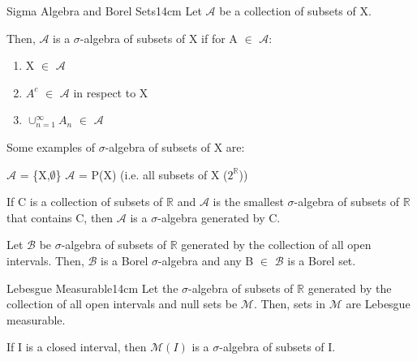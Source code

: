     \begin{definition}{Sigma Algebra and Borel Sets}{14cm}
        Let $\mathcal{A}$ be a collection of subsets of X.

        Then, $\mathcal{A}$ is a {\color{lblue} $\sigma$-algebra}
        of subsets of X if for A $\in$ $\mathcal{A}$:

        \begin{enumerate}[label=(\alph*), itemsep=1.5cm, itemsep=0.1cm]
            \item X $\in$ $\mathcal{A}$
            
            \item $A^c$ $\in$ $\mathcal{A}$ in respect to X
            
            \item $\cup_{n=1}^{\infty} A_n$ $\in$ $\mathcal{A}$
        \end{enumerate}

        Some examples of $\sigma$-algebra of subsets of X are:

        \hspace{0.5cm}
        $\mathcal{A}$ = \{X,$\emptyset$\}
        \hspace{1cm}
        $\mathcal{A}$ = P(X) (i.e. all subsets of X ($2^{\mathbb{R}}$))

        \vspace{0.3cm}

        If C is a collection of subsets of $\mathbb{R}$
        and $\mathcal{A}$ is the smallest $\sigma$-algebra of subsets
        of $\mathbb{R}$ that contains C, then $\mathcal{A}$
        is a $\sigma$-algebra generated by C.

        Let $\mathcal{B}$ be $\sigma$-algebra of subsets of $\mathbb{R}$
        generated by the collection of all open intervals.
        Then, $\mathcal{B}$ is a {\color{lblue} Borel $\sigma$-algebra}
        and any B $\in$ $\mathcal{B}$ is a Borel set.
    \end{definition}

    \vspace{0.5cm}



    \begin{definition}{Lebesgue Measurable}{14cm}
        Let the $\sigma$-algebra of subsets of $\mathbb{R}$ generated by
        the collection of all open intervals and null sets be $\mathcal{M}$.
        Then, sets in $\mathcal{M}$ are {\color{lblue} Lebesgue measurable}.

        If I is a closed interval, then $\mathcal{M}(I)$
        is a $\sigma$-algebra of subsets of I.
    \end{definition}

